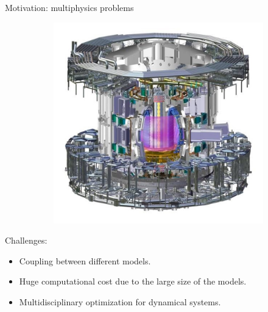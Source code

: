 \documentclass[aspectratio=169]{beamer}
\begin{document}
\begin{frame}{Motivation: multiphysics problems}
\begin{figure}[t]
\begin{subfigure}[t]{0.26\textwidth}
				\includegraphics[width=\columnwidth]{tcws.jpg}\\
			\end{subfigure}
		\end{figure}
		Challenges:
		\begin{itemize}
			\item Coupling between different models.​
			\item Huge computational cost due to the large size of the models.​
			\item Multidisciplinary optimization for dynamical systems.​
		\end{itemize}
		
	\end{frame}
\end{document}
